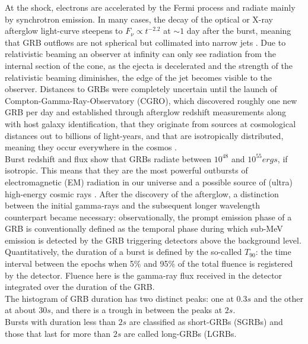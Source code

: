 \documentclass[binding=0.6cm, LaM]{sapthesis}
\begin{document}
        At the shock, electrons are accelerated by the Fermi process and radiate mainly by synchrotron emission\cite{153,162}.
        In many cases, the decay of the optical or X-ray afterglow light-curve steepens
        to $F_{\nu} \propto t^{−2.2}$ at $\sim 1$ day after the burst, meaning that GRB outflows
        are not spherical but collimated into narrow jets \cite{183}.
        Due to relativistic beaming an observer at infinity can only see radiation from the internal section of the cone,
        as the ejecta is decelerated and the strength of the relativistic beaming diminishes,
        the edge of the jet becomes visible to the observer.
        Distances to GRBs were completely uncertain until the launch of Compton-Gamma-Ray-Observatory (CGRO),
        which discovered roughly one new GRB per day and established
        through afterglow redshift measurements along with host galaxy identification, that they originate
        from sources at cosmological distances out to billions of light-years, and
        that are isotropically distributed, meaning they occur everywhere in the cosmos \cite{184}.\\
        Burst redshift and flux show that GRBs radiate between $10^48$ and $10^55 ergs$, if isotropic.
        This means that they are the most powerful outbursts of electromagnetic (EM) radiation in our universe
        and a possible source of (ultra) high-energy cosmic rays \cite{185,186}.
        After the discovery of the afterglow, a distinction between the initial gamma-rays
        and the subsequent longer wavelength counterpart became necessary:
        observationally, the prompt emission phase of a GRB is conventionally defined
        as the temporal phase during which sub-MeV emission is detected by
        the GRB triggering detectors above the background level. \\
        Quantitatively, the duration of a burst is defined by the so-called $T_90$:
        the time interval between the epochs when 5\% and 95\% of the total fluence is registered by the detector.
        Fluence here is the gamma-ray flux received in the detector integrated over the duration of the GRB. \\
        The histogram of GRB duration has two distinct peaks:
        one at $0.3s$ and the other at about $30s$, and there is a trough in between the peaks at $2s$. \\
        Bursts with duration less than $2s$ are classified as short-GRBs (SGRBs)
        and those that last for more than $2s$ are called long-GRBs (LGRBs.
\end{document}
